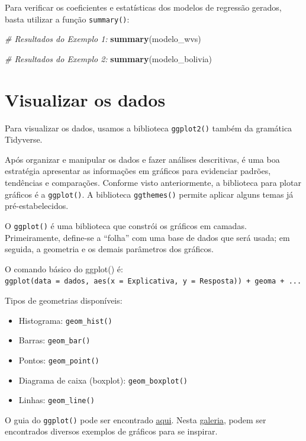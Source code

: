 \documentclass[
  10pt,
  brazil,
  a4paper,
  twoside, notitlepage, openright]{book}
\newenvironment{Shaded}{\begin{snugshade}}{\end{snugshade}}
\newcommand{\CommentTok}[1]{\textcolor[rgb]{0.56,0.35,0.01}{\textit{#1}}}
\newcommand{\KeywordTok}[1]{\textcolor[rgb]{0.13,0.29,0.53}{\textbf{#1}}}
\newcommand{\NormalTok}[1]{#1}
\providecommand{\tightlist}{%
  \setlength{\itemsep}{0pt}\setlength{\parskip}{0pt}}
\begin{document}
Para verificar os coeficientes e estatísticas dos modelos de regressão gerados, basta utilizar a função \texttt{summary()}:

\begin{Shaded}
\begin{Highlighting}[]
\CommentTok{# Resultados do Exemplo 1: }
\KeywordTok{summary}\NormalTok{(modelo_wvs)}

\CommentTok{# Resultados do Exemplo 2: }
\KeywordTok{summary}\NormalTok{(modelo_bolivia)}
\end{Highlighting}
\end{Shaded}

\hypertarget{visualizar-os-dados}{%
\chapter{Visualizar os dados}\label{visualizar-os-dados}}

Para visualizar os dados, usamos a biblioteca \texttt{ggplot2()} também da gramática Tidyverse.

Após organizar e manipular os dados e fazer análises descritivas, é uma boa estratégia apresentar as informações em gráficos para evidenciar padrões, tendências e comparações. Conforme visto anteriormente, a biblioteca para plotar gráficos é a \texttt{ggplot()}. A biblioteca \texttt{ggthemes()} permite aplicar alguns temas já pré-estabelecidos.

O \texttt{ggplot()} é uma biblioteca que constrói os gráficos em camadas. Primeiramente, define-se a ``folha'' com uma base de dados que será usada; em seguida, a geometria e os demais parâmetros dos gráficos.

O comando básico do ggplot() é: \texttt{ggplot(data\ =\ dados,\ aes(x\ =\ Explicativa,\ y\ =\ Resposta))\ +\ geoma\ +\ ...}

Tipos de geometrias disponíveis:

\begin{itemize}
\tightlist
\item
  Histograma: \texttt{geom\_hist()}
\item
  Barras: \texttt{geom\_bar()}
\item
  Pontos: \texttt{geom\_point()}
\item
  Diagrama de caixa (boxplot): \texttt{geom\_boxplot()}
\item
  Linhas: \texttt{geom\_line()}
\end{itemize}

O guia do \texttt{ggplot()} pode ser encontrado \href{https://ggplot2.tidyverse.org/index.html}{aqui}. Nesta \href{https://www.r-graph-gallery.com/}{galeria}, podem ser encontrados diversos exemplos de gráficos para se inspirar.
\end{document}
